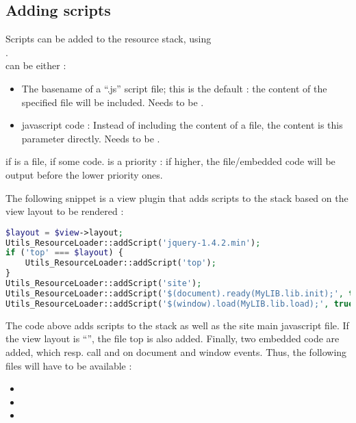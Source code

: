 \documentclass[pdftex,12pt,a4paper]{article}
\begin{document}
\subsection{Adding scripts} \label{sec:adding-scripts}

Scripts can be added to the resource stack, using\\
.\\
 can be either :
\begin{itemize}
	\item The basename of a ``.js'' script file; this is the default : the content of the specified file will be included. Needs  to be .
	\item javascript code : Instead of including the content of a file, the content is this parameter directly. Needs  to be .
\end{itemize}
  if  is a file,  if some code.
 is a priority : if higher, the file/embedded code will be output before the lower priority ones.

The following snippet is a view plugin that adds scripts to the stack based on the view layout to be rendered :
\begin{lstlisting}[label="add-script-sample",caption="Sample to add scripts to the stack",language=php]
$layout = $view->layout;
Utils_ResourceLoader::addScript('jquery-1.4.2.min');
if ('top' === $layout) {
	Utils_ResourceLoader::addScript('top');
}
Utils_ResourceLoader::addScript('site');
Utils_ResourceLoader::addScript('$(document).ready(MyLIB.lib.init);', true);
Utils_ResourceLoader::addScript('$(window).load(MyLIB.lib.load);', true);
\end{lstlisting}
The code above adds  scripts to the stack as well as the site main javascript file. If the view layout is ``'', the file top is also added.
Finally, two embedded code are added, which resp. call  and  on document  and window  events.
Thus, the following files will have to be available :
\begin{itemize}
	\item {}
	\item {}
	\item {}
\end{itemize}
\end{document}
